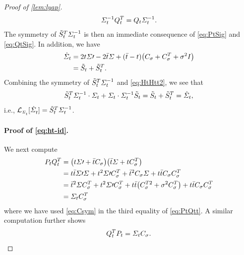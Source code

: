 \begin{proof}[Proof of \cref{lem:lyap}]
\begin{align}
\label{eq:QtSig}
\Sigma^{-1}_{t}Q_{t}^T  = Q_{t} \Sigma^{-1}_{t}.
\end{align}The symmetry of $\tilde{S}_{t}^T \Sigma^{-1}_{t}$ is then an immediate consequence of \eqref{eq:PtSig} and \eqref{eq:QtSig}. In addition, we have
\begin{align}
\nn
\dSigcurve &= 2\ctime\Sigma\prime - 2 \ctimebar\Sigma + (\ctimebar-\ctime)\parens*{   \C +\C^T   + \sdev^2\eye } \\
\label{eq:HtHtt2}
&=  \Ht + \Ht^T .
\end{align}
Combining the symmetry of $\tilde{S}_{t}^T \Sigma^{-1}_{t}$ and \eqref{eq:HtHtt2}, we see that
\begin{align}
\nonumber
\tilde{S}_{t}^T \Sigma^{-1}_{t} \cdot \Sigma_{t} + \Sigma_{t} \cdot \Sigma^{-1}_{t} \tilde{S}_{t} = \tilde{S}_{t}+\tilde{S}_{t}^T  = \dot{\Sigma}_{t},
\end{align}
i.e., $\lyap = \Ht^T \Sigcurveinv$.



\paragraph{Proof of \eqref{eq:ht-id}.}

We next compute
\begin{align}
\nn
\Pt \Qt^T  &= \parens*{\ctime \Sigma\prime + \ctimebar \C}\parens*{\ctimebar \Sigma + \ctime \C^T } \\
\nn
&= \ctime\ctimebar\Sigma\prime\Sigma + \ctime^2\Sigma\prime\C^T  + \ctimebar^2\C\Sigma + \ctime\ctimebar\C\C^T  \\
\nn
&= \ctimebar^2\Sigma \C^T  + \ctime^2\Sigma\prime\C^T + \ctime\ctimebar \parens*{ \C^{T  2}+ \sdev^2\C^T  }+ \ctime\ctimebar  \C\C^T 
\\
\label{eq:PtQtt}
&= \Sigcurve\C^T 
\end{align}
where we have used \eqref{eq:Csym} in the third equality of \eqref{eq:PtQtt}. A similar computation further shows 
\begin{align}
\label{eq:QttPt}
Q_{t}^T P_{t} = \Sigma_{t}C_{\sigma}.
\end{align}


\end{proof}
